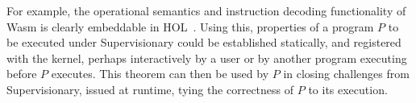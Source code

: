 \documentclass[sigplan, review]{acmart}
\begin{document}
For example, the operational semantics and instruction decoding functionality of Wasm is clearly embeddable in HOL~\cite{DBLP:conf/cpp/Watt18}.
Using this, properties of a program $P$ to be executed under Supervisionary could be established statically, and registered with the kernel, perhaps interactively by a user or by another program executing before $P$ executes.
This theorem can then be used by $P$ in closing challenges from Supervisionary, issued at runtime, tying the correctness of $P$ to its execution.

\newpage


\end{document}
